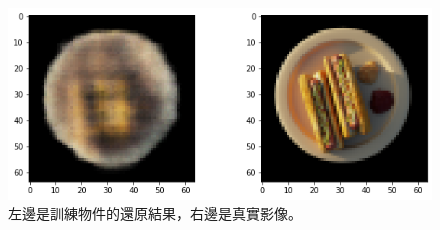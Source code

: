 \documentclass[10pt,twocolumn,letterpaper]{article}
\begin{document}
\begin{CJK}{UTF8}{bkai}
\begin{figure}
\begin{center}
         \includegraphics[width=1\linewidth]{img/experiment/train_4.png}
      \end{center}
      \caption{
         左邊是訓練物件的還原結果，右邊是真實影像。
      }
      \label{fig:train_results}
   \end{figure}


\end{CJK}
\end{document}
